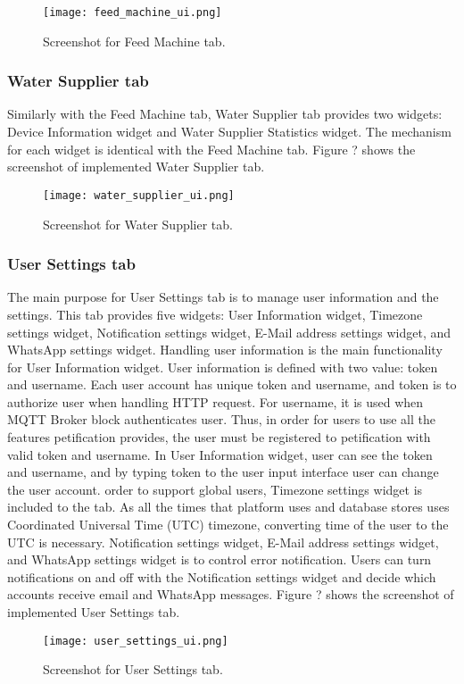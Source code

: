 \documentclass[conference]{IEEEtran}
\begin{document}
\begin{figure}[htbp]
\centerline{\texttt{[image: feed\_machine\_ui.png]}}
\caption{Screenshot for Feed Machine tab.}
\label{fig}
\end{figure}

\subsubsection{Water Supplier tab}
Similarly with the Feed Machine tab, Water Supplier tab provides two widgets: Device Information widget and Water Supplier Statistics widget. The mechanism for each widget is identical with the Feed Machine tab. Figure ?
shows the screenshot of implemented Water Supplier tab.
\begin{figure}[htbp]
\centerline{\texttt{[image: water\_supplier\_ui.png]}}
\caption{Screenshot for Water Supplier tab.}
\label{fig}
\end{figure}

\subsubsection{User Settings tab}
The main purpose for User Settings tab is to manage user information and the settings. This tab provides five widgets: User Information widget, Timezone settings widget, Notification settings widget, E-Mail address settings widget, and WhatsApp settings widget. Handling user information is the main functionality for User Information widget. User information is defined with two value: token and username. Each user account has unique token and username, and token is to authorize user when handling HTTP request. For username, it is used when MQTT Broker block authenticates user. Thus, in order for users to use all the features petification provides, the user must be registered to petification with valid token and username. In User Information widget, user can see the token and username, and by typing token to the user input interface user can change the user account.
\indentIn order to support global users, Timezone settings widget is included to the tab. As all the times that platform uses and database stores uses Coordinated Universal Time (UTC) timezone, converting time of the user to the UTC is necessary. Notification settings widget, E-Mail address settings widget, and WhatsApp settings widget is to control error notification. Users can turn notifications on and off with the Notification settings widget and decide which accounts receive email and WhatsApp messages. Figure ?
shows the screenshot of implemented User Settings tab.
\begin{figure}[htbp]
\centerline{\texttt{[image: user\_settings\_ui.png]}}
\caption{Screenshot for User Settings tab.}
\label{fig}
\end{figure}
\end{document}
